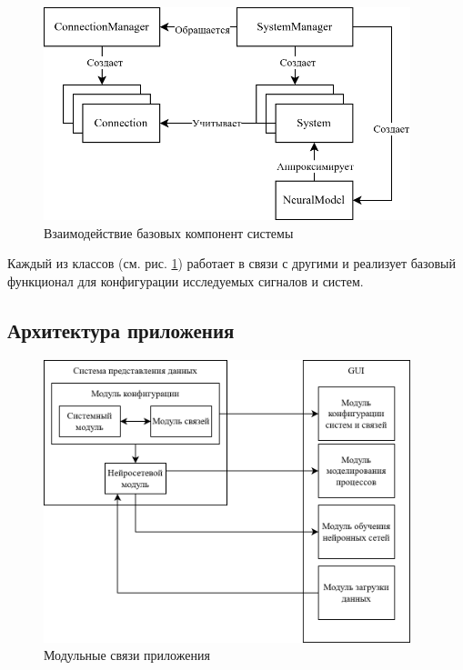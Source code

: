 \begin{figure}[H]
  \begin{center}
    \includegraphics[width=0.95\textwidth]{figures/basics_relations.png}
  \end{center}
  \caption{Взаимодействие базовых компонент системы}\label{fig:basics:components}
\end{figure}

Каждый из классов (см. рис. \ref{fig:basics:components}) работает в связи с другими и реализует базовый функционал для конфигурации исследуемых сигналов и систем.

\subsection{Архитектура приложения}

\begin{figure}[H]
  \begin{center}
    \includegraphics[width=0.95\textwidth]{figures/modules/relations.png}
  \end{center}
  \caption{Модульные связи приложения}\label{fig:modules:relation}
\end{figure}


